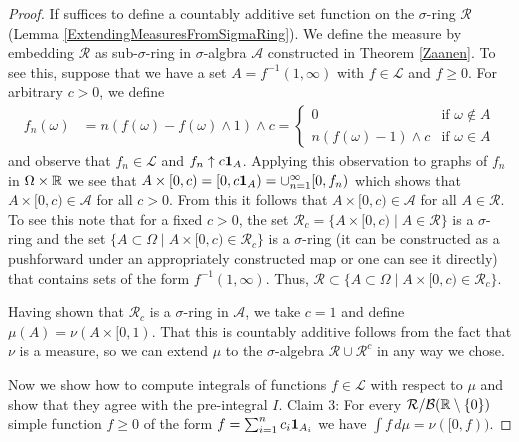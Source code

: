 \begin{proof}
If suffices to define a countably additive set function on the $\sigma$-ring $\mathcal{R}$
(Lemma \ref{ExtendingMeasuresFromSigmaRing}).  We define the measure by embedding $\mathcal{R}$ as
sub-$\sigma$-ring in $\sigma$-algbra $\mathcal{A}$ constructed in
Theorem \ref{Zaanen}.  To see this, suppose that we have a set $A =
f^{-1}(1, \infty)$ with $f \in \mathcal{L}$ and $f \geq 0$.  For arbitrary $c > 0$,
we define
\begin{align*}
f_n(\omega) &= n(f(\omega) - f(\omega) \wedge 1) \wedge c
= \begin{cases}
0 &  \text{if $\omega \notin A$} \\
n(f(\omega) - 1) \wedge c & \text{if $\omega \in A$}
\end{cases}
\end{align*}
and observe that $f_n \in \mathcal{L}$ and $f_n \uparrow c\textbf{1}_{A}$.  Applying this
observation to graphs of $f_n$ in $\Omega \times \mathbb{R}$ we see that
$A \times [0,c) = [0, c\textbf{1}_{A}) = \cup_{n=1}^\infty [0, f_n)$ which shows that $A
\times [0,c) \in \mathcal{A}$ for all $c > 0$.  From this it follows
that $A \times [0,c) \in \mathcal{A}$ for all $A \in \mathcal{R}$.  To
see this note that for a fixed $c >0$, the set $\mathcal{R}_c = \lbrace A \times [0,c)
\mid A \in \mathcal{R} \rbrace$ is a $\sigma$-ring and the set
$\lbrace A \subset \Omega \mid A \times [0,c) \in \mathcal{R}_c
\rbrace$ is a $\sigma$-ring (it can be constructed as a pushforward
under an appropriately constructed map or one can see it directly)
that contains sets of the form $f^{-1}(1, \infty)$.  Thus,
$\mathcal{R} \subset \lbrace A \subset \Omega \mid A \times [0,c) \in \mathcal{R}_c
\rbrace$.

Having shown that $\mathcal{R}_c$ is a $\sigma$-ring in $\mathcal{A}$,
we take $c=1$ and define $\mu(A) = \nu(A \times [0,1)$.  That this
is countably additive follows from the fact that $\nu$ is a measure,
so we can extend $\mu$ to the $\sigma$-algebra $\mathcal{R} \cup
\mathcal{R}^c$ in any way we chose.

Now we show how to compute integrals of functions $f \in \mathcal{L}$
with respect to $\mu$ and show that they agree with the pre-integral
$I$.
Claim 3: For every $\mathcal{R}/\mathcal{B}(\mathbb{R} \setminus \lbrace 0
\rbrace)$ simple function $f \geq 0$ of the form $f = \sum_{i=1}^n c_i
\textbf{1}_{A_i}$ we have $\int f \, d\mu = \nu([0,f))$.


\end{proof}
